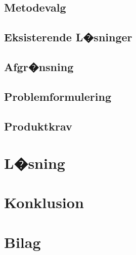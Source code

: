\documentclass[12pt]{report}
\begin{document}
	\section{Metodevalg}
	

	\section{Eksisterende L�sninger}
	

	\section{Afgr�nsning}
	

	\section{Problemformulering}
		
	
	\section{Produktkrav}
	
	



\chapter{L�sning}



\chapter{Konklusion}






\chapter*{Bilag}
\end{document}
